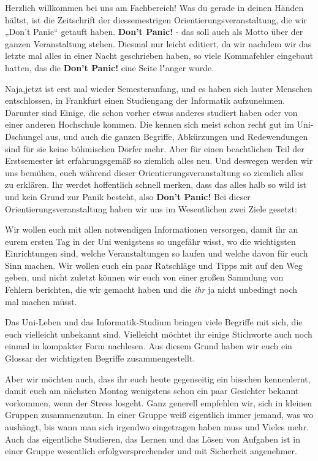 \spaltenanfang
Herzlich willkommen bei uns am Fachbereich! Was du gerade in deinen Händen
hältst, ist die Zeitschrift der diessemestrigen Orientierungsveranstaltung, die
wir „Don’t Panic“ getauft haben. \textbf{Don’t Panic!} - das soll auch als
Motto über der ganzen Veranstaltung stehen. Diesmal nur leicht editiert,
da wir nachdem wir das letzte mal alles in einer Nacht geschrieben haben,
so viele Kommafehler eingebaut hatten, das die \textbf{Don't Panic!} eine Seite
l"anger wurde. 


Naja,jetzt ist erst mal wieder Semesteranfang, und es haben sich lauter Menschen entschlossen,
in Frankfurt einen Studiengang der Informatik aufzunehmen. Darunter sind
Einige, die schon vorher etwas anderes studiert haben oder von einer anderen
Hochschule kommen. Die kennen sich meist schon recht gut im Uni-Dschungel aus,
und auch die ganzen Begriffe, Abkürzungen und Redewendungen sind für sie keine
böhmischen Dörfer mehr. Aber für einen beachtlichen Teil der Erstsemester ist
erfahrungsgemäß so ziemlich alles neu. Und deswegen werden wir uns bemühen,
euch während dieser Orientierungsveranstaltung so ziemlich alles zu erklären.
Ihr werdet hoffentlich schnell merken, dass das alles halb so wild ist und kein
Grund zur Panik besteht, also \textbf{Don’t Panic!} Bei dieser
Orientierungsveranstaltung haben wir uns im Wesentlichen zwei Ziele gesetzt:


Wir wollen euch mit allen notwendigen Informationen versorgen, damit ihr an
eurem ersten Tag in der Uni wenigstens so ungefähr wisst, wo die wichtigsten
Einrichtungen sind, welche Veranstaltungen so laufen und welche davon für euch
Sinn machen. Wir wollen euch ein paar Ratschläge und Tipps mit auf den Weg
geben, und nicht zuletzt können wir euch von einer großen Sammlung von Fehlern
berichten, die wir gemacht haben und die \textsl{ihr} ja nicht unbedingt noch
mal machen müsst.


Das Uni-Leben und das Informatik-Studium bringen viele Begriffe mit sich, die
euch vielleicht unbekannt sind. Vielleicht möchtet ihr einige Stichworte auch
noch einmal in kompakter Form nachlesen. Aus diesem Grund haben wir euch ein
Glossar der wichtigsten Begriffe zusammengestellt.


Aber wir möchten auch, dass ihr euch heute gegenseitig ein
bisschen kennenlernt, damit euch am nächsten Montag wenigstens schon ein paar
Gesichter bekannt vorkommen, wenn der Stress losgeht. Ganz generell empfehlen
wir, sich in kleinen Gruppen zusammenzutun. In einer Gruppe weiß eigentlich
immer jemand, was wo aushängt, bis wann man sich irgendwo eingetragen haben
muss und Vieles mehr. Auch das eigentliche Studieren, das Lernen und das Lösen
von Aufgaben ist in einer Gruppe wesentlich erfolgversprechender und mit
Sicherheit angenehmer.\\
\spaltenende
